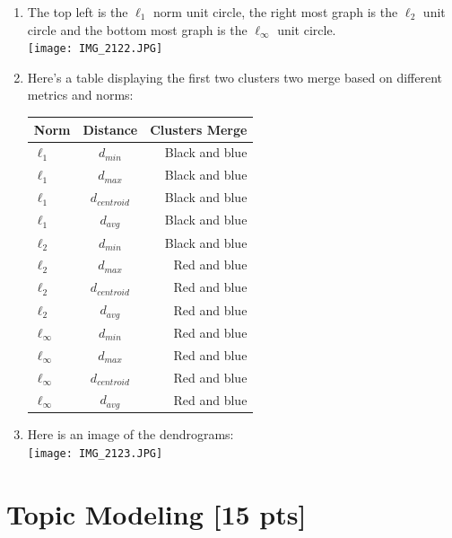 \documentclass[submit]{harvardml}
\begin{document}
	\begin{enumerate}
		
		\item The top left is the $\ell_1$ norm unit circle, the right most graph is the $\ell_2$ unit circle and the bottom most graph is the $\ell_\infty$ unit circle.  \\ 
		
		\texttt{[image: IMG\_2122.JPG]}
		
		\item Here's a table displaying the first two clusters two merge based on different metrics and norms: \\
		\begin{tabular}{l | c | r}
			
			Norm & Distance & Clusters Merge \\
			\hline
			$\ell_1$ & $d_{min}$ & Black and blue \\
			$\ell_1$ & $d_{max}$ & Black and blue \\
			$\ell_1$ & $d_{centroid}$ & Black and blue \\
			$\ell_1$ & $d_{avg}$ & Black and blue \\
			
			$\ell_2$ & $d_{min}$ & Black and blue \\
			$\ell_2$ & $d_{max}$ & Red and blue \\
			$\ell_2$ & $d_{centroid}$ & Red and blue \\
			$\ell_2$ & $d_{avg}$ & Red and blue \\
			
			$\ell_\infty$ & $d_{min}$ & Red and blue \\
			$\ell_\infty$ & $d_{max}$ & Red and blue \\
			$\ell_\infty$ & $d_{centroid}$ & Red and blue \\
			$\ell_\infty$ & $d_{avg}$ & Red and blue \\
			
		\end{tabular}
		
		\item Here is an image of the dendrograms: \\
		\texttt{[image: IMG\_2123.JPG]}
	\end{enumerate}
	
	
	
	
	\newpage 
	\section*{Topic Modeling [15 pts]}
	
\end{document}
